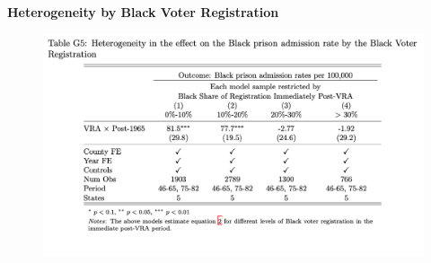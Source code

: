 \documentclass[12pt]{article}
\begin{document}


\vspace*{.1in}
\textbf{Heterogeneity by Black Voter Registration}


\begin{figure}
	\centering
	\includegraphics[width=\textwidth]{../../60_appendix_cty_results/table_g5.png}
\end{figure}
\end{document}

